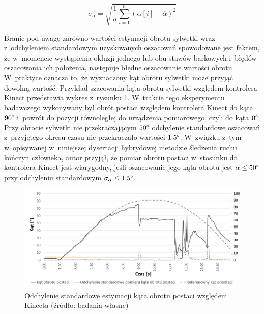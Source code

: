 \begin{equation}
	\sigma_\alpha = \sqrt{\frac{1}{n}\sum_{i=1}^{n}{(\alpha[i] - \overline{\alpha})^2}}
	\label{eq:stdDev}
\end{equation}
												
Branie pod uwagę zarówno wartości estymacji obrotu sylwetki wraz z~odchyleniem standardowym uzyskiwanych oszacowań spowodowane jest faktem, że w~momencie wystąpienia okluzji jednego lub obu stawów barkowych i~błędów oszacowania ich położenia, następuje błędne oszacowanie wartości obrotu. W~praktyce oznacza to, że wyznaczony kąt obrotu sylwetki może przyjąć dowolną wartość. Przykład szacowania kąta obrotu sylwetki względem kontrolera Kinect przedstawia wykres z~rysunku \ref{fig:hybrid:kinect:kinectRotationVariance}. W~trakcie tego eksperymentu badawczego wykonywany był obrót postaci względem kontrolera Kinect do kąta $90\degree$ i~powrót do pozycji równoległej do urządzenia pomiarowego, czyli do kąta $0\degree$. Przy obrocie sylwetki nie przekraczającym $50\degree$ odchylenie standardowe oszacowań z~przyjętego okresu czasu nie przekraczało wartości $1.5\degree$. W~związku z~tym w~opisywanej w~niniejszej dysertacji hybrydowej metodzie śledzenia ruchu kończyn człowieka, autor przyjął, że pomiar obrotu postaci w~stosunku do kontrolera Kinect jest wiarygodny, jeśli oszacowanie jego kąta obrotu jest $\alpha \le 50\degree$ przy odchyleniu standardowym $\sigma_\alpha\le 1.5 \degree$.
												
\begin{savenotes}
	\begin{figure}[!htb]
		\centering
		\includegraphics[width=\textwidth]{images/kinectRotationStdDev.png}
		\caption{Odchylenie standardowe estymacji kąta obrotu postaci względem Kinecta  (źródło: badania własne)}						
		\label{fig:hybrid:kinect:kinectRotationVariance}
	\end{figure}
\end{savenotes}
														
